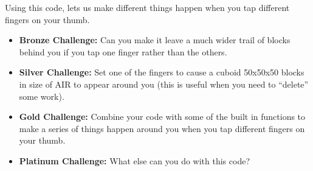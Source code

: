 \documentclass{geocraft-worksheet-multipage}
\begin{document}
\noindent Using this code, lets us make different things happen when you tap different fingers on your thumb.

\begin{itemize}
\item\textbf{Bronze Challenge:} Can you make it leave a much wider trail of blocks behind you if you tap one finger
  rather than the others.

\item\textbf{Silver Challenge:} Set one of the fingers to cause a cuboid 50x50x50 blocks in size of AIR to appear around
  you (this is useful when you need to ``delete'' some work).

\item\textbf{Gold Challenge:} Combine your code with some of the built in functions to make a series of things happen
  around you when you tap different fingers on your thumb. 

\item\textbf{Platinum Challenge:} What else can you do with this code?

\end{itemize}
\end{document}
